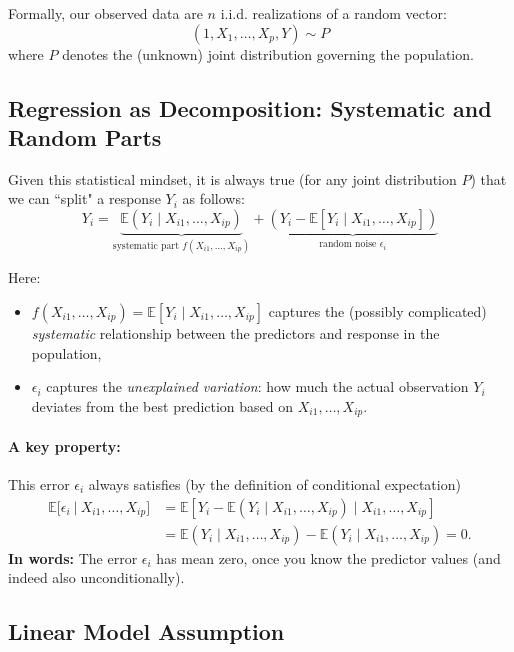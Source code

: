 \documentclass[12pt]{article}
\begin{document}
Formally, our observed data are $n$ i.i.d. realizations of a random vector:
\[
\left(1, X_1, \ldots, X_p, Y\right) \sim P
\]
where $P$ denotes the (unknown) joint distribution governing the population.

\subsection*{Regression as Decomposition: Systematic and Random Parts}

Given this statistical mindset, it is always true (for any joint distribution $P$) that we can ``split" a response $Y_i$ as follows:
\begin{equation}
  Y_i = \underbrace{\mathbb{E}\left(Y_i \mid X_{i1}, \ldots, X_{ip}\right)}_{\text{systematic part } f(X_{i1},\ldots,X_{ip})} + 
  \underbrace{(Y_i - \mathbb{E}[Y_i \mid X_{i1},\ldots,X_{ip}])}_{\text{random noise } \epsilon_i}
\end{equation}

Here:
\begin{itemize}
  \item $f(X_{i1},\ldots,X_{ip}) = \mathbb{E}[Y_i \mid X_{i1}, \ldots, X_{ip}]$ captures the (possibly complicated) \emph{systematic} relationship between the predictors and response in the population,
  \item $\epsilon_i$ captures the \emph{unexplained variation}: how much the actual observation $Y_i$ deviates from the best prediction based on $X_{i1},\ldots,X_{ip}$.
\end{itemize}

\paragraph{A key property:} This error $\epsilon_i$ always satisfies (by the definition of conditional expectation)
\begin{align*}
\mathbb{E}\big[\epsilon_i\ \big|\ X_{i1},\ldots,X_{ip}\big] 
  &= \mathbb{E}\left[ Y_i - \mathbb{E}(Y_i \mid X_{i1},\ldots,X_{ip}) \mid X_{i1},\ldots,X_{ip}\right] \\
  &= \mathbb{E}(Y_i \mid X_{i1},\ldots,X_{ip}) - \mathbb{E}(Y_i \mid X_{i1},\ldots,X_{ip}) = 0.
\end{align*}
\textbf{In words:} The error $\epsilon_i$ has mean zero, once you know the predictor values (and indeed also unconditionally).

\bigskip

\subsection{Linear Model Assumption}
\end{document}
